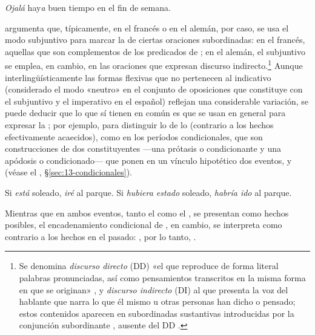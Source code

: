 \begin{exe}
  \ex\label{ex:14-ojala} \textit{Ojalá} hay\textit{a} buen tiempo en el fin de
      semana.
\end{exe}

\textcite{dahl2015} argumenta que, típicamente, en el francés o en el alemán,
por caso, se usa el modo subjuntivo para marcar la  de ciertas
oraciones subordinadas: en el francés, aquellas que son complementos de los
predicados de ; en el alemán, el subjuntivo se emplea, en cambio, en
las oraciones que expresan discurso indirecto.\footnote{Se denomina
\textit{discurso directo} (DD) «el que reproduce de forma literal palabras
pronunciadas, así como pensamientos transcritos en la misma forma en que se
originan» \parencite[§\,43.9a]{rae2025}, y \textit{discurso indirecto} (DI) al
que presenta la voz del hablante que narra lo que él mismo u otras personas han
dicho o pensado; estos contenidos aparecen en subordinadas sustantivas
introducidas por la conjunción subordinante , ausente del DD
\parencite[§\,43.9c]{rae2025}.} Aunque interlingüísticamente las formas
flexivas que no pertenecen al indicativo (considerado el modo «neutro» en el
conjunto de oposiciones que constituye con el subjuntivo y el imperativo en el
español) reflejan una considerable variación, se puede deducir que lo que sí
tienen en común es que se usan en general para expresar la ; por
ejemplo, para distinguir lo  de lo  (contrario a
los hechos efectivamente acaecidos), como en los períodos condicionales, que son
construcciones de dos constituyentes ---una prótasis o condicionante y una
apódosis o condicionado--- que ponen en un vínculo hipotético dos eventos,
 y  (véase el ,
§\ref{sec:13-condicionales}).

\begin{exe}
  \ex\label{ex:14-parque1} Si \textit{está} soleado, \textit{iré} al parque.
  \ex\label{ex:14-parque2} Si \textit{hubiera estado} soleado, \textit{habría ido}
      al parque.
\end{exe}

Mientras que en  ambos eventos, tanto el  como el , se presentan como hechos posibles, el
encadenamiento condicional de , en cambio, se interpreta
como contrario a los hechos en el pasado: , por lo
tanto, .

